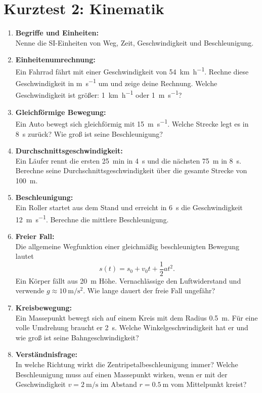 \documentclass[11pt, a4paper]{article}
\begin{document}
\section*{Kurztest 2: Kinematik}

\begin{enumerate}[label=\textbf{\arabic*.},itemsep=0.50cm]
    \vspace{1cm}

    \item \textbf{Begriffe und Einheiten:} \\
    Nenne die SI-Einheiten von Weg, Zeit, Geschwindigkeit und Beschleunigung.

    \item \textbf{Einheitenumrechnung:} \\
    Ein Fahrrad fährt mit einer Geschwindigkeit von \SI{54}{\kilo\meter\per\hour}. Rechne diese Geschwindigkeit in \unit{\meter\per\second} um und zeige deine Rechnung. 
    Welche Geschwindigkeit ist größer: \SI{1}{\kilo\meter\per\hour} oder \SI{1}{\meter\per\second}?

    \item \textbf{Gleichförmige Bewegung:} \\
    Ein Auto bewegt sich gleichförmig mit \SI{15}{\meter\per\second}. Welche Strecke legt es in \SI{8}{\second} zurück? Wie groß ist seine Beschleunigung?

    \item \textbf{Durchschnittsgeschwindigkeit:} \\
    Ein Läufer rennt die ersten \SI{25}{\meter}in  in \SI{4}{\second} und die nächsten \SI{75}{\meter} in \SI{8}{\second}. Berechne seine Durchschnittsgeschwindigkeit über die gesamte Strecke von \SI{100}{\meter}.

    \item \textbf{Beschleunigung:} \\
    Ein Roller startet aus dem Stand und erreicht in \SI{6}{\second} die Geschwindigkeit \SI{12}{\meter\per\second}. Berechne die mittlere Beschleunigung.

    \item \textbf{Freier Fall:} \\
    Die allgemeine Wegfunktion einer gleichmäßig beschleunigten Bewegung lautet
    \[ s(t) = s_0 + v_0 t + \frac{1}{2} a t^2. \]
    Ein Körper fällt aus \SI{20}{\meter} Höhe. Vernachlässige den Luftwiderstand und verwende $g \approx \SI{10}{\meter\per\second^2}$. Wie lange dauert der freie Fall ungefähr?

    \item \textbf{Kreisbewegung:} \\
    Ein Massepunkt bewegt sich auf einem Kreis mit dem Radius \SI{0.5}{\meter}. Für eine volle Umdrehung braucht er \SI{2}{\second}. Welche Winkelgeschwindigkeit hat er und wie groß ist seine Bahngeschwindigkeit?

    \item \textbf{Verständnisfrage:} \\
    In welche Richtung wirkt die Zentripetalbeschleunigung immer? Welche Beschleunigung muss auf einen Massepunkt wirken, wenn er mit der Geschwindigkeit $v = \SI{2}{\meter\per\second}$ im Abstand $r = \SI{0.5}{\meter}$ vom Mittelpunkt kreist?
\end{enumerate}
\end{document}

